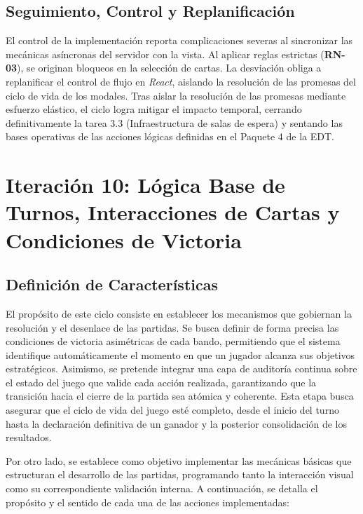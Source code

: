 \section{Seguimiento, Control y Replanificación}
El control de la implementación reporta complicaciones severas al sincronizar las mecánicas asíncronas del servidor con la vista. Al aplicar reglas estrictas (\textbf{RN-03}), se originan bloqueos en la selección de cartas. La desviación obliga a replanificar el control de flujo en \textit{React}, aislando la resolución de las promesas del ciclo de vida de los modales. Tras aislar la resolución de las promesas mediante esfuerzo elástico, el ciclo logra mitigar el impacto temporal, cerrando definitivamente la tarea 3.3 (Infraestructura de salas de espera) y sentando las bases operativas de las acciones lógicas definidas en el Paquete 4 de la EDT.


\chapter[Iteración 10: Lógica de Turnos y Victorias]{Iteración 10: Lógica Base de Turnos, Interacciones de Cartas y Condiciones de Victoria}

\section{Definición de Características}
El propósito de este ciclo consiste en establecer los mecanismos que gobiernan la resolución y el desenlace de las partidas. Se busca definir de forma precisa las condiciones de victoria asimétricas de cada bando, permitiendo que el sistema identifique automáticamente el momento en que un jugador alcanza sus objetivos estratégicos. Asimismo, se pretende integrar una capa de auditoría continua sobre el estado del juego que valide cada acción realizada, garantizando que la transición hacia el cierre de la partida sea atómica y coherente. Esta etapa busca asegurar que el ciclo de vida del juego esté completo, desde el inicio del turno hasta la declaración definitiva de un ganador y la posterior consolidación de los resultados.

Por otro lado, se establece como objetivo implementar las mecánicas básicas que estructuran el desarrollo de las partidas, programando tanto la interacción visual como su correspondiente validación interna. A continuación, se detalla el propósito y el sentido de cada una de las acciones implementadas:

